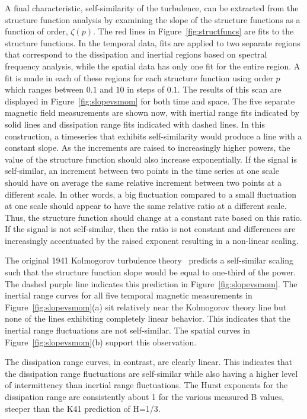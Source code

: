 \documentclass[aps,prl,amsmath,amssymb,reprint,superscriptaddress]{revtex4-1} %
\begin{document}
A final characteristic, self-similarity of the turbulence, can be extracted from the structure function analysis by examining the slope of the structure functions as a function of order, $\zeta(p)$. The red lines in Figure~\ref{fig:structfuncs} are fits to the structure functions. In the temporal data, fits are applied to two separate regions that correspond to the dissipation and inertial regions based on spectral frequency analysis, while the spatial data has only one fit for the entire region. A fit is made in each of these regions for each structure function using order $p$ which ranges between $0.1$ and $10$ in steps of $0.1$. The results of this scan are displayed in Figure~\ref{fig:slopevsmom} for both time and space. The five separate magnetic field measurements are shown now, with inertial range fits indicated by solid lines and dissipation range fits indicated with dashed lines. In this construction, a timeseries that exhibits self-similarity would produce a line with a constant slope. As the increments are raised to increasingly higher powers, the value of the structure function should also increase exponentially. If the signal is self-similar, an increment between two points in the time series at one scale should have on average the same relative increment between two points at a different scale. In other words, a big fluctuation compared to a small fluctuation at one scale should appear to have the same relative ratio at a different scale. Thus, the structure function should change at a constant rate based on this ratio. If the signal is not self-similar, then the ratio is not constant and differences are increasingly accentuated by the raised exponent resulting in a non-linear scaling.

The original 1941 Kolmogorov turbulence theory~\cite{kolmogorov41} predicts a self-similar scaling such that the structure function slope would be equal to one-third of the power. The dashed purple line indicates this prediction in Figure~\ref{fig:slopevsmom}. The inertial range curves for all five temporal magnetic measurements in Figure~\ref{fig:slopevsmom}(a) sit relatively near the Kolmogorov theory line but none of the lines exhibiting completely linear behavior. This indicates that the inertial range fluctuations are not self-similar. The spatial curves in Figure~\ref{fig:slopevsmom}(b) support this observation.

The dissipation range curves, in contrast, are clearly linear. This indicates that the dissipation range fluctuations are self-similar while also having a higher level of intermittency than inertial range fluctuations. The Hurst exponents for the dissipation range are consistently about 1 for the various measured B values, steeper than the K41 prediction of H=1/3.
\end{document}
